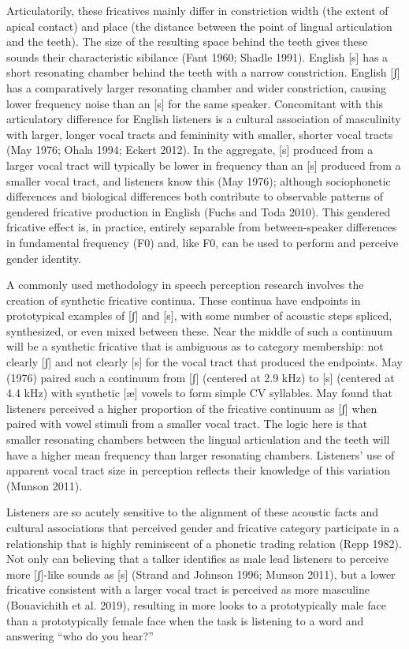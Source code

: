 \documentclass[
  letterpaper,
  DIV=11,
  numbers=noendperiod]{scrartcl}
\begin{document}
Articulatorily, these fricatives mainly differ in constriction width
(the extent of apical contact) and place (the distance between the point
of lingual articulation and the teeth). The size of the resulting space
behind the teeth gives these sounds their characteristic sibilance (Fant
1960; Shadle 1991). English {[}s{]} has a short resonating chamber
behind the teeth with a narrow constriction. English {[}ʃ{]} has a
comparatively larger resonating chamber and wider constriction, causing
lower frequency noise than an {[}s{]} for the same speaker. Concomitant
with this articulatory difference for English listeners is a cultural
association of masculinity with larger, longer vocal tracts and
femininity with smaller, shorter vocal tracts (May 1976; Ohala 1994;
Eckert 2012). In the aggregate, {[}s{]} produced from a larger vocal
tract will typically be lower in frequency than an {[}s{]} produced from
a smaller vocal tract, and listeners know this (May 1976); although
sociophonetic differences and biological differences both contribute to
observable patterns of gendered fricative production in English (Fuchs
and Toda 2010). This gendered fricative effect is, in practice, entirely
separable from between-speaker differences in fundamental frequency (F0)
and, like F0, can be used to perform and perceive gender identity.

A commonly used methodology in speech perception research involves the
creation of synthetic fricative continua. These continua have endpoints
in prototypical examples of {[}ʃ{]} and {[}s{]}, with some number of
acoustic steps spliced, synthesized, or even mixed between these. Near
the middle of such a continuum will be a synthetic fricative that is
ambiguous as to category membership: not clearly {[}ʃ{]} and not clearly
{[}s{]} for the vocal tract that produced the endpoints. May (1976)
paired such a continuum from {[}ʃ{]} (centered at 2.9 kHz) to {[}s{]}
(centered at 4.4 kHz) with synthetic {[}æ{]} vowels to form simple CV
syllables. May found that listeners perceived a higher proportion of the
fricative continuum as {[}ʃ{]} when paired with vowel stimuli from a
smaller vocal tract. The logic here is that smaller resonating chambers
between the lingual articulation and the teeth will have a higher mean
frequency than larger resonating chambers. Listeners' use of apparent
vocal tract size in perception reflects their knowledge of this
variation (Munson 2011).

Listeners are so acutely sensitive to the alignment of these acoustic
facts and cultural associations that perceived gender and fricative
category participate in a relationship that is highly reminiscent of a
phonetic trading relation (Repp 1982). Not only can believing that a
talker identifies as male lead listeners to perceive more {[}ʃ{]}-like
sounds as {[}s{]} (Strand and Johnson 1996; Munson 2011), but a lower
fricative consistent with a larger vocal tract is perceived as more
masculine (Bouavichith et al. 2019), resulting in more looks to a
prototypically male face than a prototypically female face when the task
is listening to a word and answering ``who do you hear?''
\end{document}

